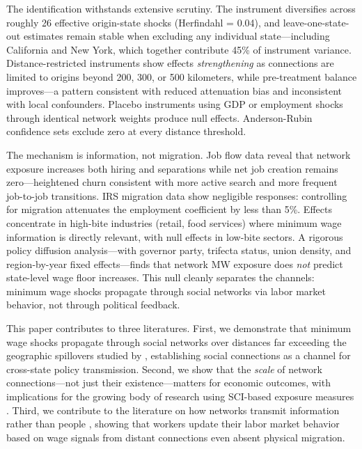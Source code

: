\documentclass[12pt]{article}
\begin{document}
The identification withstands extensive scrutiny. The instrument diversifies across roughly 26 effective origin-state shocks (Herfindahl = 0.04), and leave-one-state-out estimates remain stable when excluding any individual state---including California and New York, which together contribute 45\% of instrument variance. Distance-restricted instruments show effects \textit{strengthening} as connections are limited to origins beyond 200, 300, or 500 kilometers, while pre-treatment balance improves---a pattern consistent with reduced attenuation bias and inconsistent with local confounders. Placebo instruments using GDP or employment shocks through identical network weights produce null effects. Anderson-Rubin confidence sets exclude zero at every distance threshold.

The mechanism is information, not migration. Job flow data reveal that network exposure increases both hiring and separations while net job creation remains zero---heightened churn consistent with more active search and more frequent job-to-job transitions. IRS migration data show negligible responses: controlling for migration attenuates the employment coefficient by less than 5\%. Effects concentrate in high-bite industries (retail, food services) where minimum wage information is directly relevant, with null effects in low-bite sectors. A rigorous policy diffusion analysis---with governor party, trifecta status, union density, and region-by-year fixed effects---finds that network MW exposure does \textit{not} predict state-level wage floor increases. This null cleanly separates the channels: minimum wage shocks propagate through social networks via labor market behavior, not through political feedback.

This paper contributes to three literatures. First, we demonstrate that minimum wage shocks propagate through social networks over distances far exceeding the geographic spillovers studied by \citet{dube2014designing}, establishing social connections as a channel for cross-state policy transmission. Second, we show that the \textit{scale} of network connections---not just their existence---matters for economic outcomes, with implications for the growing body of research using SCI-based exposure measures \citep{bailey2018social, bailey2018house, chetty2022social}. Third, we contribute to the literature on how networks transmit information rather than people \citep{jager2024worker, kramarz2023, faberman2022}, showing that workers update their labor market behavior based on wage signals from distant connections even absent physical migration.
\end{document}
